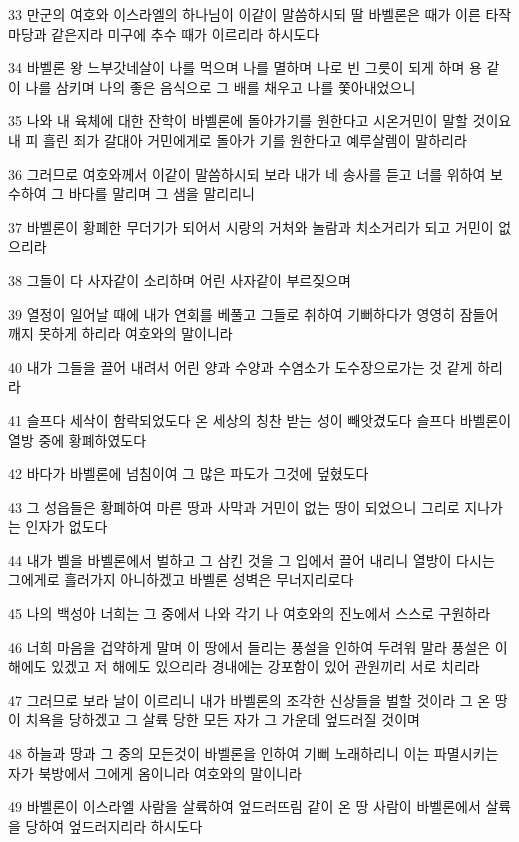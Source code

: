\par 33 만군의 여호와 이스라엘의 하나님이 이같이 말씀하시되 딸 바벨론은 때가 이른 타작마당과 같은지라 미구에 추수 때가 이르리라 하시도다
\par 34 바벨론 왕 느부갓네살이 나를 먹으며 나를 멸하며 나로 빈 그릇이 되게 하며 용 같이 나를 삼키며 나의 좋은 음식으로 그 배를 채우고 나를 쫓아내었으니
\par 35 나와 내 육체에 대한 잔학이 바벨론에 돌아가기를 원한다고 시온거민이 말할 것이요 내 피 흘린 죄가 갈대아 거민에게로 돌아가 기를 원한다고 예루살렘이 말하리라
\par 36 그러므로 여호와께서 이같이 말씀하시되 보라 내가 네 송사를 듣고 너를 위하여 보수하여 그 바다를 말리며 그 샘을 말리리니
\par 37 바벨론이 황폐한 무더기가 되어서 시랑의 거처와 놀람과 치소거리가 되고 거민이 없으리라
\par 38 그들이 다 사자같이 소리하며 어린 사자같이 부르짖으며
\par 39 열정이 일어날 때에 내가 연회를 베풀고 그들로 취하여 기뻐하다가 영영히 잠들어 깨지 못하게 하리라 여호와의 말이니라
\par 40 내가 그들을 끌어 내려서 어린 양과 수양과 수염소가 도수장으로가는 것 같게 하리라
\par 41 슬프다 세삭이 함락되었도다 온 세상의 칭찬 받는 성이 빼앗겼도다 슬프다 바벨론이 열방 중에 황폐하였도다
\par 42 바다가 바벨론에 넘침이여 그 많은 파도가 그것에 덮혔도다
\par 43 그 성읍들은 황폐하여 마른 땅과 사막과 거민이 없는 땅이 되었으니 그리로 지나가는 인자가 없도다
\par 44 내가 벨을 바벨론에서 벌하고 그 삼킨 것을 그 입에서 끌어 내리니 열방이 다시는 그에게로 흘러가지 아니하겠고 바벨론 성벽은 무너지리로다
\par 45 나의 백성아 너희는 그 중에서 나와 각기 나 여호와의 진노에서 스스로 구원하라
\par 46 너희 마음을 겁약하게 말며 이 땅에서 들리는 풍설을 인하여 두려워 말라 풍설은 이 해에도 있겠고 저 해에도 있으리라 경내에는 강포함이 있어 관원끼리 서로 치리라
\par 47 그러므로 보라 날이 이르리니 내가 바벨론의 조각한 신상들을 벌할 것이라 그 온 땅이 치욕을 당하겠고 그 살륙 당한 모든 자가 그 가운데 엎드러질 것이며
\par 48 하늘과 땅과 그 중의 모든것이 바벨론을 인하여 기뻐 노래하리니 이는 파멸시키는 자가 북방에서 그에게 옴이니라 여호와의 말이니라
\par 49 바벨론이 이스라엘 사람을 살륙하여 엎드러뜨림 같이 온 땅 사람이 바벨론에서 살륙을 당하여 엎드러지리라 하시도다
